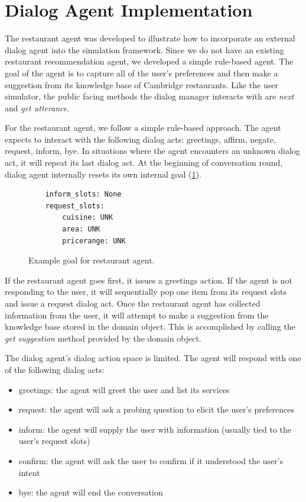 \section{Dialog Agent Implementation}

The restaurant agent was developed to illustrate how to incorporate an external dialog agent into the simulation framework. Since we do not have an existing restaurant recommendation agent, we developed a simple rule-based agent. The goal of the agent is to capture all of the user's preferences and then make a suggestion from its knowledge base of Cambridge restaurants. Like the user simulator, the public facing methods the dialog manager interacts with are \textit{next} and \textit{get utterance}. 

For the restaurant agent, we follow a simple rule-based approach. The agent expects to interact with the following dialog acts: greetings, affirm, negate, request, inform, bye. In situations where the agent encounters an unknown dialog act, it will repeat its last dialog act. At the beginning of conversation round, dialog agent internally resets its own internal goal (\ref{fig:ex_res_agent_goal}). 

 \begin{figure}[h!]
 	\begin{lstlisting}
 	inform_slots: None
 	request_slots:
 		cuisine: UNK
 		area: UNK
 		pricerange: UNK 	
 	\end{lstlisting}
 	\caption{ Example goal for restaurant agent.}
 	\label{fig:ex_res_agent_goal}
 \end{figure}

If the restaurant agent goes first, it issues a greetings action. If the agent is not responding to the user, it will sequentially pop one item from its request slots and issue a request dialog act. Once the restaurant agent has collected information from the user, it will attempt to make a suggestion from the knowledge base stored in the domain object. This is accomplished by calling the \textit{get suggestion} method provided by the domain object.

The dialog agent's dialog action space is limited. The agent will respond with one of the following dialog acts:
\begin{itemize}
	\item greetings: the agent will greet the user and list its services
	\item request: the agent will ask a probing question to elicit the user's preferences
	\item inform: the agent will supply the user with information (usually tied to the user's request slots)
	\item confirm: the agent will ask the user to confirm if it understood the user's intent 
	\item bye: the agent will end the conversation  
\end{itemize}

